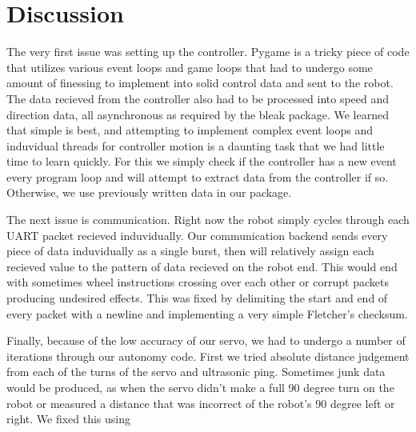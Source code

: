 \documentclass[letterpaper,11pt]{texMemo} %
\begin{document}
\section*{Discussion}
The very first issue was setting up the controller. Pygame is a tricky piece of code 
that utilizes various event loops and game loops that had to undergo some amount 
of finessing to implement into solid control data and sent to the robot. The data 
recieved from the controller also had to be processed into speed and direction data, 
all asynchronous as required by the bleak package. We learned that simple is best, 
and attempting to implement complex event loops and induvidual threads for controller 
motion is a daunting task that we had little time to learn quickly. For this we 
simply check if the controller has a new event every program loop and will attempt 
to extract data from the controller if so. Otherwise, we use previously written data 
in our package.

The next issue is communication. Right now the robot simply cycles through each UART
packet recieved induvidually. Our communication backend sends every piece of data 
induvidually as a single burst, then will relatively assign each recieved value to 
the pattern of data recieved on the robot end. This would end with sometimes 
wheel instructions crossing over each other or corrupt packets producing undesired 
effects. This was fixed by delimiting the start and end of every packet with a newline 
and implementing a very simple Fletcher's checksum.

Finally, because of the low accuracy of our servo, we had to undergo a number of iterations 
through our autonomy code. First we tried absolute distance judgement from each of the turns 
of the servo and ultrasonic ping. Sometimes junk data would be produced, as when the servo 
didn't make a full 90 degree turn on the robot or measured a distance that was incorrect 
of the robot's 90 degree left or right. We fixed this using %
 

\newpage
\end{document}
